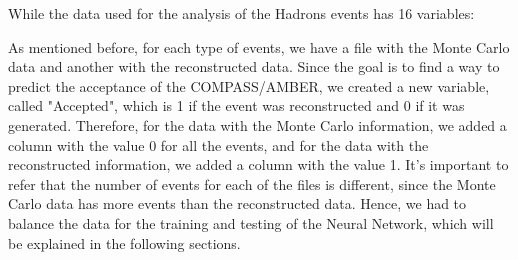 \documentclass[EPJ,twocolumn]{webofc}
\begin{document}
While the data used for the analysis of the Hadrons events has 16 variables:

\begin{table}[H]
    \centering
\end{table}



As mentioned before, for each type of events, we have a file with the Monte Carlo data and another with the reconstructed data.
Since the goal is to find a way to predict the acceptance of the COMPASS/AMBER, we created a new variable, called "Accepted",
which is 1 if the event was reconstructed and 0 if it was generated. Therefore, for the data with the Monte Carlo information, we added
a column with the value 0 for all the events, and for the data with the reconstructed information, we added a column with the value 1.
It's important to refer that the number of events for each of the files is different, since the Monte Carlo data has more events than the reconstructed data.
Hence, we had to balance the data for the training and testing of the Neural Network, which will be explained in the following sections.
\end{document}
